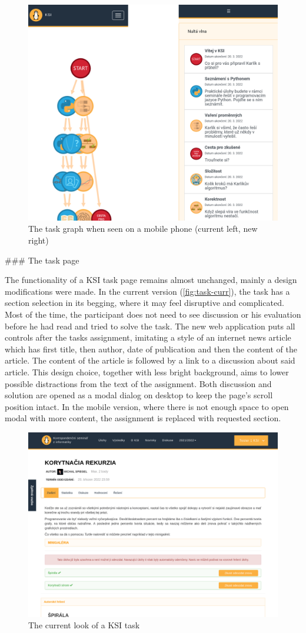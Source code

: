 \documentclass[
  digital, %
  oneside, %
  lof,     %
  lot,     %
]{fithesis4}
\begin{document}
{\begin{figure}
\includegraphics[width=.5\textwidth]{assets/img/graph-mobile}
\caption{The task graph when seen on a mobile phone (current left, new right)}
\label{fig:graph-mobile}
\end{figure}


### The task page

The functionality of a KSI task page remains almost unchanged, mainly a design modifications were made. In the current version (\autoref{fig:task-curr}), the task has a section selection in its begging, where it may feel disruptive and complicated. Most of the time, the participant does not need to see discussion or his evaluation before he had read and tried to solve the task. The new web application puts all controls after the tasks assignment, imitating a style of an internet news article which has first title, then author, date of publication and then the content of the article. The content of the article is followed by a link to a discussion about said article. This design choice, together with less bright background, aims to lower possible distractions from the text of the assignment. Both discussion and solution are opened as a modal dialog on desktop to keep the page's scroll position intact. In the mobile version, where there is not enough space to open modal with more content, the assignment is replaced with requested section.


\begin{figure}
\includegraphics[width=.9\textwidth]{assets/img/task-curr}
\caption{The current look of a KSI task}
\label{fig:task-curr}
\end{figure}

}
\end{document}
